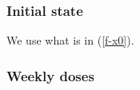 \documentclass[11pt]{article}
\theoremstyle{remark}
\newcommand{\src}[1]{\path{#1}}
\newcommand{\fref}[1]{\ref{#1}}
\begin{document}
\subsubsection{Initial state}\label{sec-x0}

We use what is in (\fref{f-x0}).

\subsubsection{Weekly doses}\label{sec-doses}
\end{document}
